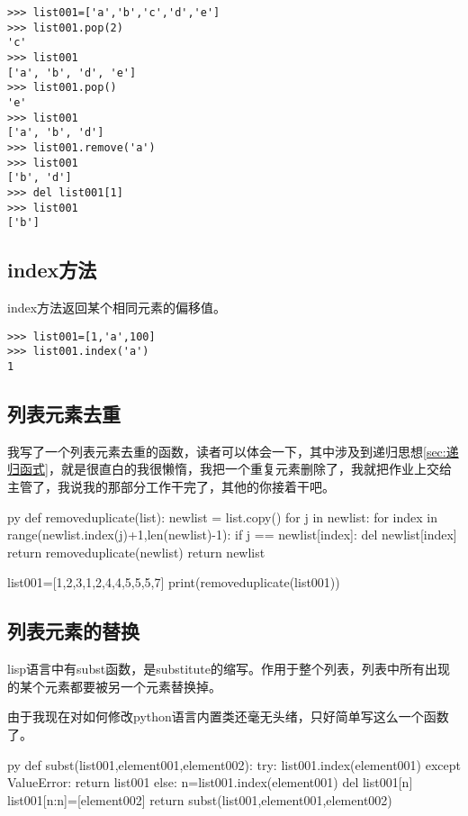 \documentclass[12pt,oneside]{book}
\begin{document}
\begin{common-format}
\begin{Verbatim}
>>> list001=['a','b','c','d','e']
>>> list001.pop(2)
'c'
>>> list001
['a', 'b', 'd', 'e']
>>> list001.pop()
'e'
>>> list001
['a', 'b', 'd']
>>> list001.remove('a')
>>> list001
['b', 'd']
>>> del list001[1]
>>> list001
['b']
\end{Verbatim}




\subsection{index方法}
index方法返回某个相同元素的偏移值。
\begin{Verbatim}
>>> list001=[1,'a',100]
>>> list001.index('a')
1
\end{Verbatim}

\subsection{列表元素去重}
我写了一个列表元素去重的函数，读者可以体会一下，其中涉及到递归思想\ref{sec:递归函式}，就是很直白的我很懒惰，我把一个重复元素删除了，我就把作业上交给主管了，我说我的那部分工作干完了，其他的你接着干吧。
\begin{xverbatim}[129]{py}
def removeduplicate(list):
    newlist = list.copy()
    for j in newlist:
        for index in range(newlist.index(j)+1,len(newlist)-1):
            if j == newlist[index]:
                del newlist[index]
                return removeduplicate(newlist)
    return newlist

list001=[1,2,3,1,2,4,4,5,5,5,7]
print(removeduplicate(list001))
\end{xverbatim}
  


\subsection{列表元素的替换}
lisp语言中有subst函数，是substitute的缩写。作用于整个列表，列表中所有出现的某个元素都要被另一个元素替换掉。

由于我现在对如何修改python语言内置类还毫无头绪，只好简单写这么一个函数了。
\begin{xverbatim}[129]{py}
def subst(list001,element001,element002):
    try:
        list001.index(element001)
    except ValueError:
        return list001
    else:
        n=list001.index(element001)
        del list001[n]
        list001[n:n]=[element002]
        return subst(list001,element001,element002)


\end{xverbatim}
\end{common-format}
\end{document}
